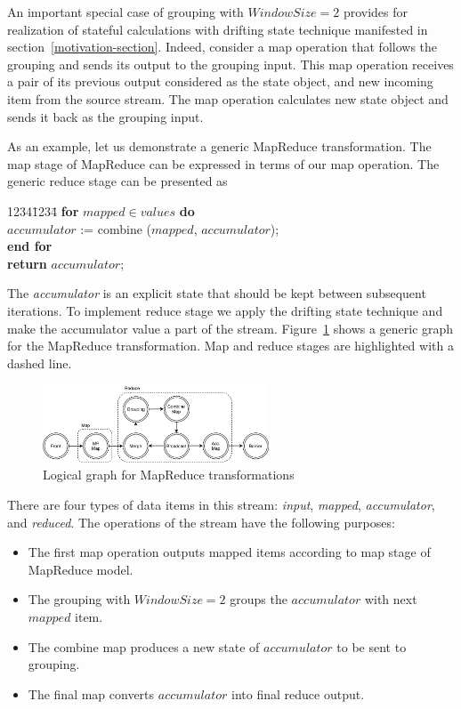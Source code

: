 \label{fs-drifting}

An important special case of grouping with $Window Size = 2$  provides for realization of stateful calculations with drifting state technique manifested in section~\ref{motivation-section}. Indeed, consider a map operation that follows the grouping and sends its output to the grouping input. This map operation receives a pair of its previous output considered as the state object, and new incoming item from the source stream. The map operation calculates new state object and sends it back as the grouping input. 

As an example, let us demonstrate a generic MapReduce transformation. The map stage of MapReduce can be expressed in terms of our map operation. The generic reduce stage can be presented as

\begin {tabbing}
1234\=1234\= \kill
{\bf for} $mapped \in values$ {\bf do}   \\
\>$accumulator$ := combine ($mapped$, $accumulator$); \\
{\bf end for} \\
{\bf return } $accumulator$;
\end {tabbing}

The {\it accumulator} is an explicit state that should be kept between subsequent iterations. To implement reduce stage we apply the drifting state technique and make the accumulator value a part of the stream. Figure~\ref{mapreduce-graph-figure} shows a generic graph for the MapReduce transformation. Map and reduce stages are highlighted with a dashed line. 

\begin{figure}[ht]
  \centering
  \includegraphics[width=0.6\textwidth]{pics/mapreduce}
  \caption{Logical graph for MapReduce transformations}
  \label {mapreduce-graph-figure}
\end{figure}

There are four types of data items in this stream: {\em input}, {\em mapped}, {\em accumulator}, and {\em reduced}. The operations of the stream have the following purposes:

\begin{itemize}
  \item The first map operation outputs mapped items according to map stage of MapReduce model.
  
  \item The grouping with $WindowSize=2$ groups the $accumulator$ with next $mapped$ item. 
  
  \item The combine map produces a new state of $accumulator$ to be sent to grouping.
  
  \item The final map converts $accumulator$ into final reduce output.
\end{itemize}

